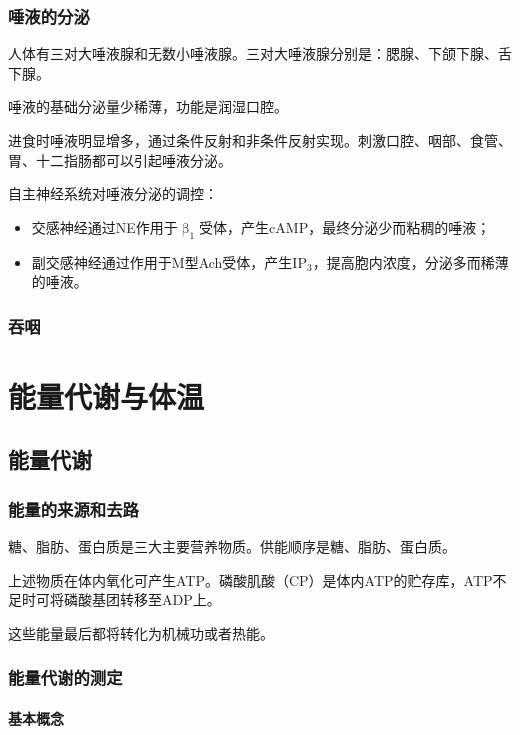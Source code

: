 \subsubsection{唾液的分泌}

人体有三对大唾液腺和无数小唾液腺。三对大唾液腺分别是：腮腺、下颌下腺、舌下腺。

唾液的基础分泌量少稀薄，功能是润湿口腔。

进食时唾液明显增多，通过条件反射和非条件反射实现。刺激口腔、咽部、食管、胃、十二指肠都可以引起唾液分泌。

自主神经系统对唾液分泌的调控：

\begin{itemize}
	\item 交感神经通过NE作用于$\upbeta_{1}$受体，产生cAMP，最终分泌少而粘稠的唾液；
	\item 副交感神经通过作用于M型Ach受体，产生IP$_{3}$，提高胞内浓度，分泌多而稀薄的唾液。
\end{itemize}

\subsubsection{吞咽}


\section{能量代谢与体温}

\subsection{能量代谢}

\subsubsection{能量的来源和去路}

糖、脂肪、蛋白质是三大主要营养物质。供能顺序是糖、脂肪、蛋白质。

上述物质在体内氧化可产生ATP。磷酸肌酸（CP）是体内ATP的贮存库，ATP不足时可将磷酸基团转移至ADP上。

这些能量最后都将转化为机械功或者热能。

\subsubsection{能量代谢的测定}

\paragraph{基本概念}

